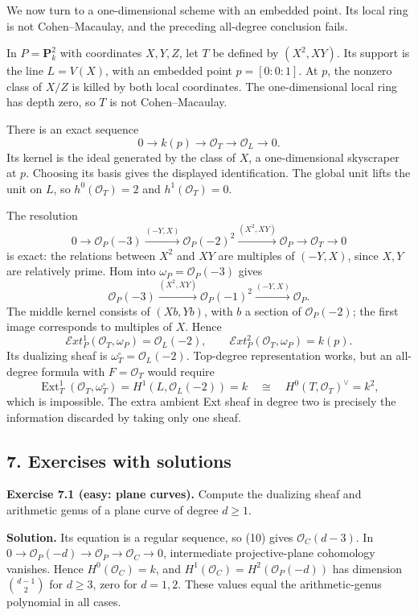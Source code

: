 \documentclass[11pt]{article}
\begin{document}
We now turn to a one-dimensional scheme with an embedded point. Its
local ring is not Cohen--Macaulay, and the preceding all-degree
conclusion fails.

In \(P=\mathbf P^2_k\) with coordinates \(X,Y,Z\), let \(T\) be defined
by \((X^2,XY)\). Its support is the line \(L=V(X)\), with an embedded
point \(p=[0:0:1]\). At \(p\), the nonzero class of \(X/Z\) is killed by
both local coordinates. The one-dimensional local ring has depth zero,
so \(T\) is not Cohen--Macaulay.

There is an exact sequence \[
0\to k(p)\to\mathcal O_T\to\mathcal O_L\to0.
\] Its kernel is the ideal generated by the class of \(X\), a
one-dimensional skyscraper at \(p\). Choosing its basis gives the
displayed identification. The global unit lifts the unit on \(L\), so
\(h^0(\mathcal O_T)=2\) and \(h^1(\mathcal O_T)=0\).

The resolution \[
0\to\mathcal O_P(-3)\xrightarrow{(-Y,X)}
 \mathcal O_P(-2)^2\xrightarrow{(X^2,XY)}
 \mathcal O_P\to\mathcal O_T\to0
\] is exact: the relations between \(X^2\) and \(XY\) are multiples of
\((-Y,X)\), since \(X,Y\) are relatively prime. Hom into
\(\omega_P=\mathcal O_P(-3)\) gives \[
\mathcal O_P(-3)\xrightarrow{(X^2,XY)}
 \mathcal O_P(-1)^2\xrightarrow{(-Y,X)}\mathcal O_P.
\] The middle kernel consists of \((Xb,Yb)\), with \(b\) a section of
\(\mathcal O_P(-2)\); the first image corresponds to multiples of \(X\).
Hence \[
\mathcal E xt^1_P(\mathcal O_T,\omega_P)=\mathcal O_L(-2),
\qquad\mathcal E xt^2_P(\mathcal O_T,\omega_P)=k(p).
\] Its dualizing sheaf is \(\omega_T^\circ=\mathcal O_L(-2)\).
Top-degree representation works, but an all-degree formula with
\(F=\mathcal O_T\) would require \[
\operatorname{Ext}^1_T(\mathcal O_T,\omega_T^\circ)
 =H^1(L,\mathcal O_L(-2))=k
 \quad\cong\quad H^0(T,\mathcal O_T)^\vee=k^2,
\] which is impossible. The extra ambient Ext sheaf in degree two is
precisely the information discarded by taking only one sheaf.

\subsection{7. Exercises with
solutions}\label{exercises-with-solutions-13}

\textbf{Exercise 7.1 (easy: plane curves).} Compute the dualizing sheaf
and arithmetic genus of a plane curve of degree \(d\geq1\).

\textbf{Solution.} Its equation is a regular sequence, so (10) gives
\(\mathcal O_C(d-3)\). In
\(0\to\mathcal O_P(-d)\to\mathcal O_P\to\mathcal O_C\to0\), intermediate
projective-plane cohomology vanishes. Hence \(H^0(\mathcal O_C)=k\), and
\(H^1(\mathcal O_C)=H^2(\mathcal O_P(-d))\) has dimension
\(\binom{d-1}{2}\) for \(d\geq3\), zero for \(d=1,2\). These values
equal the arithmetic-genus polynomial in all cases.
\end{document}

